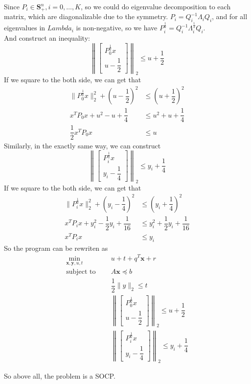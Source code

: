 Since $P_i \in \mathbf{S}_{+}^n, i=0, \ldots, K$, so we could do eigenvalue decomposition to each matrix, which are diagonalizable due to the symmetry.
$P_i=Q_i^{-1}\Lambda_iQ_i$, and for all eigenvalues in $Lambda_i$ is non-negative, so we have $P_i^{\frac{1}{2}}=Q_i^{-1}\Lambda_i^{\frac{1}{2}}Q_i$.\\
And construct an inequality:
$$\left\|
\left[\begin{array}{l}
P_0^{\frac{1}{2}}x \\
u-\dfrac{1}{2}
\end{array}\right]\right\|_2
\leq
u+\dfrac{1}{2}
$$
If we square to the both side, we can get that
\begin{align*}
    \|P_0^{\frac{1}{2}}x\|_2^2+(u-\dfrac{1}{2})^2 &\leq (u+\dfrac{1}{2})^2\\
    x^TP_0x+u^2-u+\dfrac{1}{4} &\leq u^2+u+\dfrac{1}{4} \\
    \dfrac{1}{2}x^TP_0x &\leq u
\end{align*}
Similarly, in the exactly same way, we can construct
$$\left\|
\left[\begin{array}{l}
P_i^{\frac{1}{2}}x \\
y_i-\dfrac{1}{4}
\end{array}\right]\right\|_2
\leq
y_i+\dfrac{1}{4}
$$
If we square to the both side, we can get that
\begin{align*}
    \|P_i^{\frac{1}{2}}x\|_2^2+(y_i-\dfrac{1}{4})^2 &\leq (y_i+\dfrac{1}{4})^2\\
    x^TP_ix+y_i^2-\dfrac{1}{2}y_i+\dfrac{1}{16} &\leq y_i^2+\dfrac{1}{2}y_i+\dfrac{1}{16} \\
    x^TP_ix &\leq y_i
\end{align*}
So the program can be rewriten as
\begin{align*}
    \min_{\mathbf{x},\mathbf{y},u,t}\ \ \ \ \ & u+t+q^T \mathbf{x}+r \\
    \text {subject to }\ \ \ \ \ & A \mathbf{x} \preceq b \\
    & \dfrac{1}{2}\|y\|_2 \leq t \\
    & \left\|
    \left[\begin{array}{l}
    P_0^{\frac{1}{2}}x \\
    u-\dfrac{1}{2}
    \end{array}\right]\right\|_2
    \leq
    u+\dfrac{1}{2} \\
    & \left\|
    \left[\begin{array}{l}
    P_i^{\frac{1}{2}}x \\
    y_i-\dfrac{1}{4}
    \end{array}\right]\right\|_2
    \leq
    y_i+\dfrac{1}{4}
\end{align*}

So above all, the problem is a SOCP.\\

\newpage